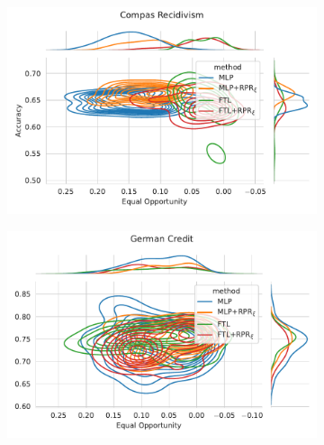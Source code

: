 \begin{figure}
\begin{subfigure}{.45\linewidth}
    \includegraphics[width=1\linewidth]{images/pareto_acc_opportunity_compas_rpr.pdf}
\end{subfigure}
\begin{subfigure}{.45\linewidth}
    \includegraphics[width=1\linewidth]{images/pareto_acc_opportunity_german_rpr.pdf}
\end{subfigure}
\end{figure}

